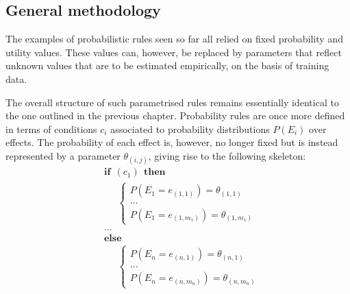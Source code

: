 \subsection{General methodology}

The examples of probabilistic rules seen so far all relied on fixed probability and utility values. These values can, however, be replaced by parameters that reflect unknown values that are to be estimated empirically, on the basis of training data. 
 
The overall structure of such parametrised rules remains essentially identical to the one outlined in the previous chapter.  Probability rules are once more defined in terms of conditions $c_i$ associated to probability distributions $P(E_i)$ over effects.  The probability of each effect is, however, no longer fixed but is instead represented by a parameter $\theta_{(i,j)}$, giving rise to the following skeleton: 
\begin{equation}
\begin{aligned}
& \textbf{if} \ \ (c_{1}) \ \ \textbf{then} \\ 
& \;\;\;\;\; \begin{cases}
P(E_1\!=\!e_{(1,1)}) = \theta_{(1,1)} \\
 \dots \\
P(E_1\!=\!e_{(1,m_1)}) = \theta_{(1,m_1)} 
\end{cases} \\[3mm]
& \dots  \\
& \textbf{else} \\
& \;\;\;\;\; \begin{cases}
P(E_{n}\!=\!e_{(n,1)}) = \theta_{(n,1)} \\
\dots \\
P(E_{n}\!=\!e_{(n,m_n)}) = \theta_{(n,m_n)}
\end{cases}
\end{aligned}
\end{equation}

